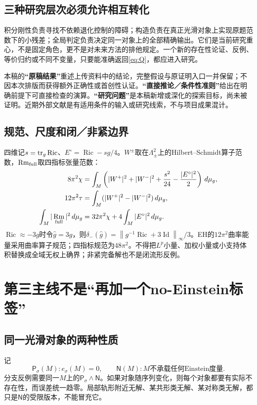 \documentclass[UTF8,fontset=fandol,zihao=-4]{ctexart}
\DeclareMathOperator{\Ric}{Ric}\DeclareMathOperator{\Rm}{Rm}
\DeclareMathOperator{\Id}{Id}\DeclareMathOperator{\Hess}{Hess}
\newcommand{\dd}{\,d\mu_g}\newcommand{\op}{\mathrm{op}}
\newcommand{\norm}[1]{\left\|#1\right\|}
\theoremstyle{cn}
\begin{document}
\subsection{三种研究层次必须允许相互转化}
积分刚性负责寻找不依赖退化控制的障碍；构造负责在真正光滑对象上实现原题范数下的小残差；全局判定负责决定同一对象上的全部精确输出。它们是当前研究重心，不是固定角色，更不是对未来方法的排他规定。一个新的存在性论证、反例、等价归约或不同不变量，只要能准确返回\eqref{eq:Q}，都应进入研究。

本稿的\textbf{“原稿结果”}重述上传资料中的结论，完整假设与原证明入口一并保留；不因本次排版而获得额外正确性或首创性认证。\textbf{“直接推论／条件性准则”}给出在明确前提下可直接检查的演算。\textbf{“研究问题”}是本稿新增或深化的探索目标，尚未被证明。近期外部文献是有适用条件的输入或研究线索，不与项目成果混计。

\subsection{规范、尺度和闭／非紧边界}
四维记$s=\tr_g\Ric$、$E^\circ=\Ric-sg/4$。$W^\pm$取在$\Lambda^2_\pm$上的Hilbert--Schmidt算子范数，$\Rm_{\rm full}$取四指标张量范数：
\begin{align}
8\pi^2\chi&=\int_M\left(|W^+|^2+|W^-|^2+\frac{s^2}{24}-\frac{|E^\circ|^2}{2}\right)\dd,\label{eq:CGB}\\
12\pi^2\tau&=\int_M(|W^+|^2-|W^-|^2)\dd,\\
\int_M|\Rm_{\rm full}|^2\dd&=32\pi^2\chi+4\int_M|E^\circ|^2\dd.\label{eq:fullenergy}
\end{align}
$\Ric\approx-3g$时令$\widehat g=3g$，则$\delta_-(\widehat g)=\norm{g^{-1}\Ric+3\Id}_\infty/3$。EH的$12\pi^2$曲率能量采用曲率算子规范；四指标规范为$48\pi^2$。不得把$L^p$小量、加权小量或小支持体积替换成全域无权上确界；非紧完备解也不是闭流形反例。

\section{第三主线不是“再加一个no-Einstein标签”}
\subsection{同一光滑对象的两种性质}
记
\[
 \mathsf P_\sigma(M):e_\sigma(M)=0,\qquad
 \mathsf N(M):M\text{不承载任何Einstein度量}.
\]
分支反例需要同一$M$上的$\mathsf P_\sigma\land\mathsf N$。如果对象随序列变化，则每个对象都要有实际不存在性，而误差统一趋零。局部轨形附近无解、某共形类无解、某对称类无解，都只是$\mathsf N$的受限版本，不能冒充它。
\end{document}

